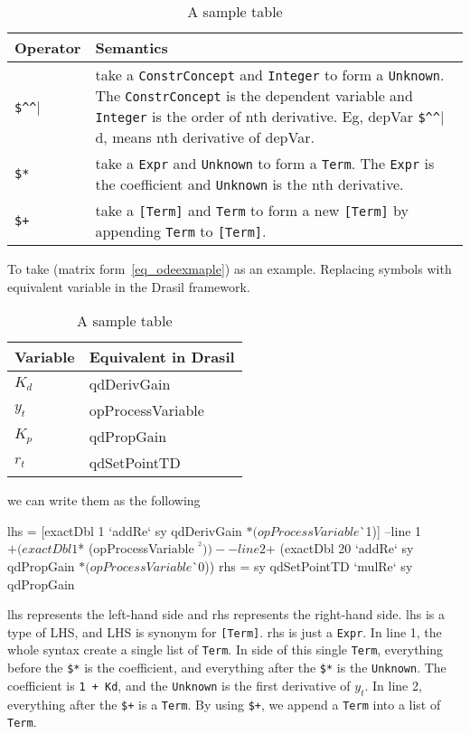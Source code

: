 \begin{table}
	\begin{tabular}{ p{} p{} }
		\textbf{Operator} & \textbf{Semantics} \\
		\toprule
		\verb|$^^| & take a \verb|ConstrConcept| and \verb|Integer| to form a \verb|Unknown|. The \verb|ConstrConcept| is the dependent variable and \verb|Integer| is the order of nth derivative. Eg, depVar \verb|$^^| d, means nth derivative of depVar.\\
		\verb|$*| & take a \verb|Expr| and \verb|Unknown| to form a \verb|Term|. The \verb|Expr| is the coefficient and \verb|Unknown| is the nth derivative.\\
		\verb|$+| & take a \verb|[Term]| and \verb|Term| to form a new \verb|[Term]| by appending \verb|Term| to \verb|[Term]|.\\
		\bottomrule	
	\end{tabular}	
	\caption{A sample table}	
	\label{tab_inputtype}
\end{table}

To take (matrix form~\ref{eq_odeexmaple}) as an example. Replacing symbols with equivalent variable in the Drasil framework.

\begin{table}
	\begin{tabular}{ p{} p{} }
		\textbf{Variable} & \textbf{Equivalent in Drasil} \\
		\toprule
		$K_d$ & qdDerivGain\\
		$y_t$ & opProcessVariable\\
		$K_p$ & qdPropGain\\
		$r_t$ & qdSetPointTD\\
		\bottomrule	
	\end{tabular}	
	\caption{A sample table}	
	\label{tab_inputtype}
\end{table}

we can write them as the following
\begin{haskell1}
lhs = [exactDbl 1 `addRe` sy qdDerivGain $* (opProcessVariable $^^ 1)] --line 1
 $+ (exactDbl 1 $* (opProcessVariable $^^ 2)) -- line 2
 $+ (exactDbl 20 `addRe` sy qdPropGain $* (opProcessVariable $^^ 0))
rhs = sy qdSetPointTD `mulRe` sy qdPropGain
\end{haskell1}

lhs represents the left-hand side and rhs represents the right-hand side. lhs is a type of LHS, and LHS is synonym for \verb|[Term]|. rhs is just a \verb|Expr|. In line 1, the whole syntax create a single list of \verb|Term|. In side of this single \verb|Term|, everything before the \verb|$*| is the coefficient, and everything after the \verb|$*| is the \verb|Unknown|. The coefficient is \verb|1 + Kd|, and the \verb|Unknown| is the first derivative of $y_t$. In line 2, everything after the \verb|$+| is a \verb|Term|. By using \verb|$+|, we append a \verb|Term| into a list of \verb|Term|.


